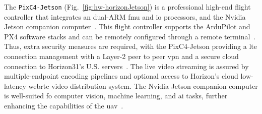 
  The \lstinline{PixC4-Jetson} (Fig.~\ref{fig:hw-horizonJetson}) is a
  professional high-end flight controller that integrates an dual-ARM
  \gls{fmu} and \gls{io} processors, and the Nvidia Jetson companion
  computer~\cite{arduPilot-horizonJetson}. This flight controller supports the
  ArduPilot and PX4 software stacks and can be remotely configured through a
  remote terminal~\cite{arduPilot-horizonJetson}. Thus, extra security measures are required, with the
  PixC4-Jetson providing a \gls{lte} connection management with a Layer-2 peer
  to peer \gls{vpn} and a secure cloud connection to Horizon31's
  U.S. servers~\cite{arduPilot-horizonJetson}. The live video streaming is
  assured by multiple-endpoint encoding pipelines and optional access to
  Horizon's cloud low-latency web\gls{rtc} video distribution system.
  The Nvidia Jetson companion computer is well-suited fo computer vision,
  machine learning, and \gls{ai} tasks, further enhancing the capabilities of
  the \gls{uav}~\cite{jetson-docs}.

